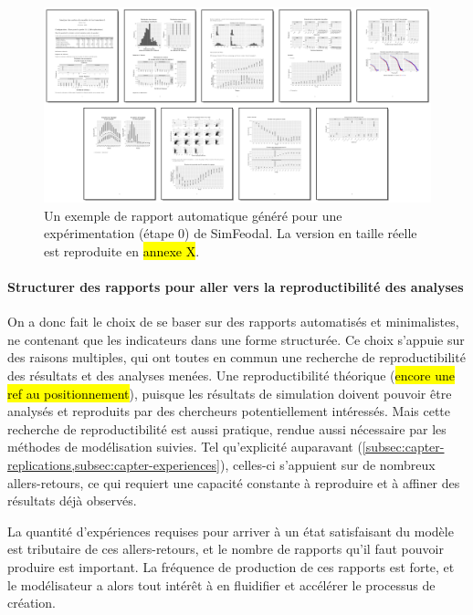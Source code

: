 	\begin{figure}[H]
		\captionsetup{width=\linewidth}
		\includegraphics[width=\linewidth]{img/SimFeodal_Rapport_exemple.png}
		\caption{Un exemple de rapport automatique généré pour une expérimentation (étape 0) de SimFeodal. La version en taille réelle est reproduite en \hl{annexe X}.}
		\label{fig:simfeodal_rapport_mini}
	\end{figure}

\clearpage
	\paragraph{Structurer des rapports pour aller vers la reproductibilité des analyses}
	On a donc fait le choix de se baser sur des rapports automatisés et minimalistes, ne contenant que les indicateurs dans une forme structurée.
	Ce choix s'appuie sur des raisons multiples, qui ont toutes en commun une recherche de reproductibilité des résultats et des analyses menées.
	Une reproductibilité théorique (\hl{encore une ref au positionnement}), puisque les résultats de simulation doivent pouvoir être analysés et reproduits par des chercheurs potentiellement intéressés.
	Mais cette recherche de reproductibilité est aussi pratique, rendue aussi nécessaire par les méthodes de modélisation suivies.
	Tel qu'explicité auparavant (\cref{subsec:capter-replications,subsec:capter-experiences}), celles-ci s'appuient sur de nombreux allers-retours, ce qui requiert une capacité constante à reproduire et à affiner des résultats déjà observés.
	
	La quantité d'expériences requises pour arriver à un état satisfaisant du modèle est tributaire de ces allers-retours, et le nombre de rapports qu'il faut pouvoir produire est important.
	La fréquence de production de ces rapports est forte, et le modélisateur a alors tout intérêt à en fluidifier et accélérer le processus de création.
	
